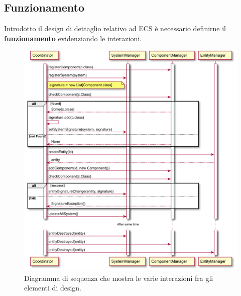 \subsection{Funzionamento}
Introdotto il design di dettaglio relativo ad ECS è necessario definirne il \textbf{funzionamento} evidenziando le interazioni.
\begin{figure}[H]
	\centering
	\includegraphics[width=0.90\columnwidth]{plantuml/rendered/sequenceDiagrams/sequenceECS.pdf}
	\caption{Diagramma di sequenza che mostra le varie interazioni fra gli elementi di design.}
	\label{fig:sequenceECS}
\end{figure}

